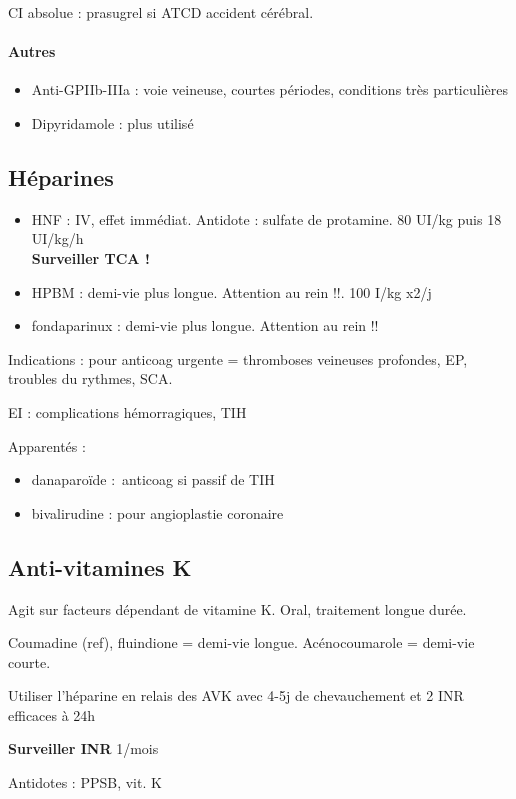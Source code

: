 CI absolue : prasugrel si ATCD accident cérébral.

\paragraph{Autres}
\begin{itemize}
  \item Anti-GPIIb-IIIa : voie veineuse, courtes périodes, conditions très particulières
  \item Dipyridamole : plus utilisé
\end{itemize}

\subsection{Héparines}%
\begin{itemize}
  \item HNF : IV, effet immédiat. Antidote : sulfate de protamine. 80 UI/kg puis
    18 UI/kg/h \\
    \textbf{Surveiller TCA !} \danger
  \item HPBM : demi-vie plus longue. Attention au rein !!. 100 I/kg x2/j
  \item fondaparinux : demi-vie plus longue. Attention au rein !!
\end{itemize}

Indications : pour anticoag urgente = thromboses veineuses profondes, EP,
troubles du rythmes, SCA.

EI : complications hémorragiques, TIH

Apparentés :
\begin{itemize}
  \item danaparoïde : anticoag si passif de TIH
  \item bivalirudine : pour angioplastie coronaire
\end{itemize}

\subsection{Anti-vitamines K}
Agit sur facteurs dépendant de vitamine K. Oral, traitement longue durée.

Coumadine (ref), fluindione = demi-vie longue. Acénocoumarole = demi-vie courte.

Utiliser l'héparine en relais des AVK avec 4-5j de chevauchement et 2 INR
efficaces à 24h

\textbf{Surveiller INR}  1/mois \danger

Antidotes : PPSB, vit. K

